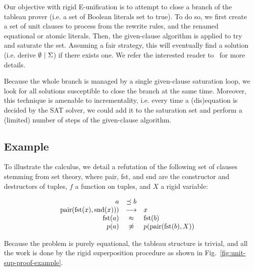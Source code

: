 Our objective with rigid E-unification is to attempt to close a branch of the
tableau prover (i.e. a set of Boolean literals set to true). To do so, we first
create a set of unit clauses to process from the rewrite rules, and the renamed
equational or atomic literals. Then, the given-clause algorithm is applied to try and
saturate the set. Assuming a fair strategy, this will eventually find a
solution (i.e. derive $\emptyset ~|~ \Sigma$) if there exists
one. We refer the interested reader to~\cite{SS02} for more details.

Because the whole branch is managed by a single given-clause saturation loop, we
look for all solutions susceptible to close the branch at the same time.
Moreover, this technique is amenable to incrementality, i.e. every time a
(dis)equation is decided by the SAT solver, we could add it to the saturation
set and perform a (limited) number of steps of the given-clause algorithm.

\subsection{Example}

To illustrate the calculus, we detail a refutation of the following set of
clauses stemming from set theory, where pair, fst, and snd are the constructor
and destructors of tuples, $f$ a function on tuples, and $X$ a rigid variable:

\[\begin{array}{rcl}
a &\preceq b \\
\text{pair}(\text{fst}(x), \text{snd}(x))) &\longrightarrow& x\\
\text{fst}(a) &\approx& \text{fst}(b)\\
p(a) &\not\approx& p(\text{pair}(\text{fst}(b), X))\\
\end{array}\]

Because the problem is purely equational, the tableau structure is trivial, and
all the work is done by the rigid superposition procedure as shown in
Fig.~\ref{fig:unit-sup-proof-example}.


